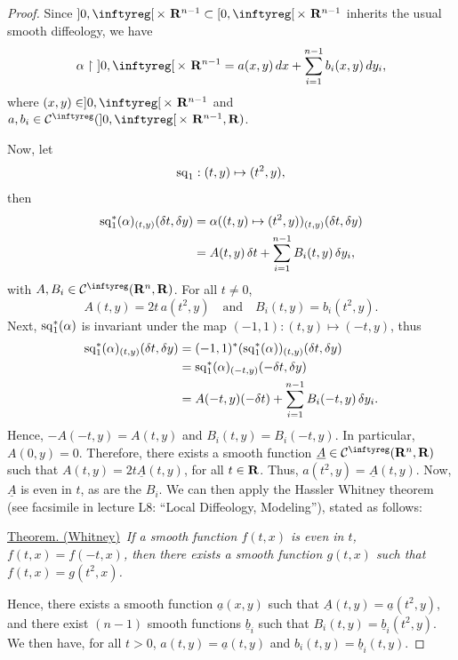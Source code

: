 \begin{proof}
  Since $]0,\infty[\, \times\ \RR^{n-1} \subset [0,\infty[\, \times\ \RR^{n-1}$ inherits the usual smooth diffeology,
  we have
  $$%
    \alpha \restriction\ ]0,\infty[\, \times\ \RR^{n-1} = a(x,y) \, dx + \sum_{i=1}^{n-1} b_i(x,y) \, dy_i,
    $$%
  where $(x,y) \in ]0,\infty[\, \times\ \RR^{n-1}$ and $a, b_i \in \Cinfty(]0,\infty[\, \times\ \RR^{n-1},\RR)$.
  
  Now,
  let
  $$%
    \Sq_1 : (t,y) \mapsto (t^2,y),
    $$%
  then
  \begin{align*}
    {\operatorname{sq}}_1^*(\alpha)_{(t,y)}(\delta t,\delta y) & = \alpha((t,y) \mapsto (t^2,y))_{(t,y)}(\delta t,\delta y) \\
    &  = A(t,y)\,\delta t + \sum_{i=1}^{n-1} B_i(t,y)\,\delta y_i,
  \end{align*}
  with $A, B_i \in \Cinfty(\RR^n,\RR)$.
  For all $t \neq 0$,
  $$%
    A(t,y) = 2t\, a(t^2,y) \quad \text{and} \quad B_i(t,y) = b_i(t^2,y).
    $$%
  Next,
  ${\operatorname{sq}}_1^*(\alpha)$ is invariant under the map $(-1,1) : (t,y) \mapsto (-t,y)$,
  thus
  \begin{align*}
    {\operatorname{sq}}_1^*(\alpha)_{(t,y)}(\delta t,\delta y)
    &= (-1,1)^*({\operatorname{sq}}_1^*(\alpha))_{(t,y)}(\delta t,\delta y) \\
    &= {\operatorname{sq}}_1^*(\alpha)_{(-t,y)}(-\delta t, \delta y) \\
    &= A(-t,y)(-\delta t) + \sum_{i=1}^{n-1} B_i(-t,y)\,\delta y_i.
  \end{align*}
  Hence,
  $-A(-t,y) = A(t,y)$ and $B_i(t,y) = B_i(-t,y)$.
  In particular,
  $A(0,y)=0$.
  Therefore,
  there exists a smooth function $\underline{A} \in \Cinfty(\RR^n,\RR)$ such that $A(t,y) = 2t \underline{A}(t,y)$,
  for all $t\in \mathbf{R}$.
  Thus,
  $a(t^2,y) = \underline{A}(t,y)$.
  Now, $\underline{A}$ is even in $t$,
  as are the $B_i$.
  We can then apply the Hassler Whitney theorem \cite[Theorem 1 and final remark]{Whi43} (see facsimile in lecture L8: ``Local Diffeology, Modeling''),
  stated as follows:
  
  \uline{Theorem. (Whitney)}~{\itshape If a smooth function $f(t,x)$ is even in $t$,
  $f(t,x) = f(-t,x)$,
  then there exists a smooth function $g(t,x)$ such that $f(t,x) = g(t^2,x)$.}
  
  Hence,
  there exists a smooth function $\underline{a}(x,y)$ such that $\underline{A}(t,y) = \underline{a}(t^2,y)$,
  and there exist $(n-1)$ smooth functions $\underline{b}_i$ such that $B_i(t,y) = \underline{b}_i(t^2,y)$.
  We then have,
  for all $t>0$,
  $a(t,y) = \underline{a}(t,y)$ and $b_i(t,y) = \underline{b}_i(t,y)$.
  

\end{proof}
